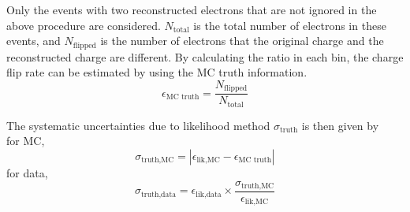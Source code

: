 Only the events with two reconstructed electrons that are not ignored in the above procedure are considered.
$N_{\text{total}}$ is the total number of electrons in these events, and $N_{\text{flipped}}$ is the number of electrons that the original charge and the reconstructed charge are different.
By calculating the ratio in each bin, the charge flip rate can be estimated by using the MC truth information.
\begin{equation}
\epsilon_{\text{MC truth}} = \frac{N_{\text{flipped}}}{N_{\text{total}}}
\end{equation}

The systematic uncertainties due to likelihood method $\sigma_{\text{truth}}$ is then given by \\
for MC,
\begin{equation}
\sigma_{\text{truth,MC}} = | \epsilon_{\text{lik,MC}} - \epsilon_{\text{MC truth}} |
\end{equation}
for data,
\begin{equation}
\sigma_{\text{truth,data}} = \epsilon_{\text{lik,data}} \times \frac{\sigma_{\text{truth,MC}}}{\epsilon_{\text{lik,MC}}}
\end{equation}

